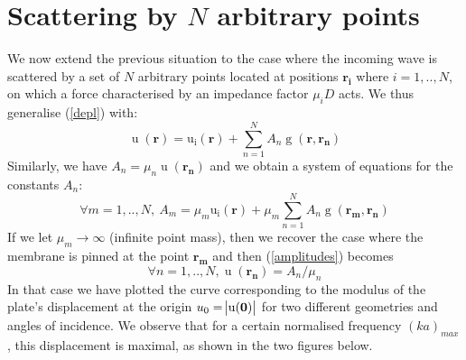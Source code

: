 \documentclass[11pt]{report}
\numberwithin{equation}{section}
\begin{document}
\chapter{Scattering by $N$ arbitrary points}

We now extend the previous situation to the case where the incoming wave is scattered by a set of $N$ arbitrary points located at positions $\bm{r_i}$ where $i=1,..,N$, on which a force characterised by an impedance factor $\mu_i D$ acts. We thus generalise  (\ref{depl}) with:
%
\begin{equation}
    \operatorname{u}(\bm{r}) = \operatorname{u_i}(\bm{r}) + \sum_{n=1}^{N} A_n \operatorname{g}(\bm{r},\bm{r_n})
\end{equation}
%
Similarly, we have $A_n = \mu_n \operatorname{u}(\bm{r_n})$ and we obtain a system of equations for the constants $A_n$:
%
\begin{equation} \label{amplitudes}
    \forall m=1,..,N, \ A_m = \mu_m \operatorname{u_i}(\bm{r}) + \mu_m \sum_{n=1}^{N} A_n \operatorname{g}(\bm{r_m},\bm{r_n})
\end{equation}
%
If we let $\mu_m \rightarrow \infty$ (infinite point mass), then we recover the case where the membrane is pinned at the point $\bm{r_m}$ and then (\ref{amplitudes}) becomes
%
\begin{equation}
    \forall n=1,..,N, \operatorname{u}(\bm{r_n}) = A_n / \mu_n   
\end{equation}
%
In that case we have plotted the curve corresponding to the modulus of the plate's displacement at the origin $u_0 = \abs{\operatorname{u}(\bm{0})}$ for two different geometries and angles of incidence. We observe that for a certain normalised frequency $(ka)_{max}$, this displacement is maximal, as shown in the two figures below.
%
\end{document}
